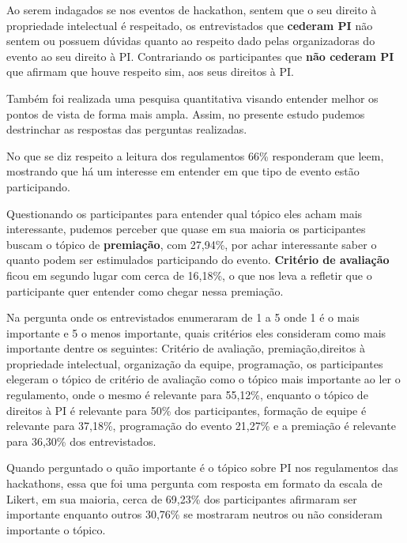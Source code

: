 Ao serem indagados se nos eventos de hackathon, sentem que o seu direito à propriedade intelectual é respeitado, os entrevistados que \textbf{cederam PI} não sentem ou possuem dúvidas quanto ao respeito dado pelas organizadoras do evento ao seu direito à PI. Contrariando os participantes que \textbf{não cederam PI} que afirmam que houve respeito sim, aos seus direitos à PI.


















Também foi realizada uma pesquisa quantitativa visando entender melhor os pontos de vista de forma mais ampla. Assim, no presente estudo pudemos destrinchar as respostas das perguntas realizadas.

No que se diz respeito a leitura dos regulamentos 66\% responderam que leem, mostrando que há um interesse em entender em que tipo de evento estão participando. 

Questionando os participantes para entender qual tópico eles acham mais interessante, pudemos perceber que quase em sua maioria os participantes buscam o tópico de \textbf{premiação}, com 27,94\%, por achar interessante saber o quanto podem ser estimulados participando do evento. \textbf{Critério de avaliação} ficou em segundo lugar com cerca de 16,18\%, o que nos leva a refletir que o participante quer entender como chegar nessa premiação.

Na pergunta onde os entrevistados enumeraram de 1 a 5 onde 1 é o mais importante e 5 o menos importante, quais critérios eles consideram como mais importante dentre os seguintes: Critério de avaliação, premiação,direitos à propriedade intelectual, organização da equipe, programação, os participantes elegeram o tópico de critério de avaliação como o tópico mais importante ao ler o regulamento, onde o mesmo é relevante para 55,12\%, enquanto o tópico de direitos à PI é relevante para 50\% dos participantes, formação de equipe é relevante para 37,18\%, programação do evento 21,27\% e a premiação é relevante para 36,30\% dos entrevistados.

Quando perguntado o quão importante é o tópico sobre PI nos regulamentos das hackathons, essa que foi uma pergunta com resposta em formato da escala de Likert, em sua maioria, cerca de 69,23\% dos participantes afirmaram ser importante enquanto outros 30,76\% se mostraram neutros ou não consideram importante o tópico.


